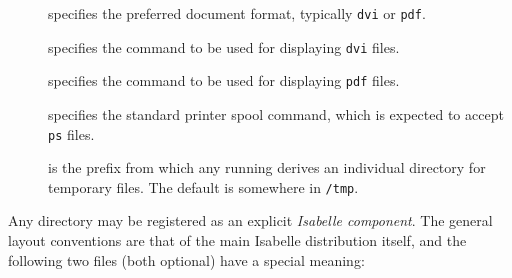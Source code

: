 \begin{isabellebody}
\begin{isamarkuptext}
\begin{description}
  \item[\hypertarget{setting.ISABELLE-DOC-FORMAT}{\hyperlink{setting.ISABELLE-DOC-FORMAT}{\mbox{}}}] specifies the preferred
  document format, typically \verb|dvi| or \verb|pdf|.
  
  \item[\hypertarget{setting.DVI-VIEWER}{\hyperlink{setting.DVI-VIEWER}{\mbox{}}}] specifies the command to be used
  for displaying \verb|dvi| files.
  
  \item[\hypertarget{setting.PDF-VIEWER}{\hyperlink{setting.PDF-VIEWER}{\mbox{}}}] specifies the command to be used
  for displaying \verb|pdf| files.
  
  \item[\hypertarget{setting.PRINT-COMMAND}{\hyperlink{setting.PRINT-COMMAND}{\mbox{}}}] specifies the standard printer
  spool command, which is expected to accept \verb|ps| files.
  
  \item[\hypertarget{setting.ISABELLE-TMP-PREFIX}{\hyperlink{setting.ISABELLE-TMP-PREFIX}{\mbox{}}}] is the
  prefix from which any running \hyperlink{executable.isabelle-process}{\mbox{}}
  derives an individual directory for temporary files.  The default is
  somewhere in \verb|/tmp|.
  
  \end{description}%
\end{isamarkuptext}%
\isamarkuptrue%
%
\isamarkuptrue%
%
\begin{isamarkuptext}%
Any directory may be registered as an explicit \emph{Isabelle
  component}.  The general layout conventions are that of the main
  Isabelle distribution itself, and the following two files (both
  optional) have a special meaning:


\end{isamarkuptext}
\end{isabellebody}
